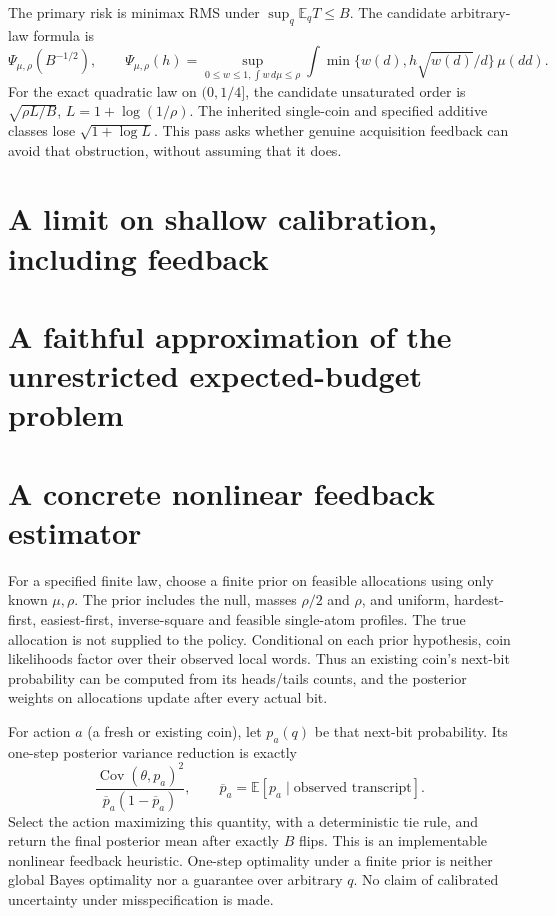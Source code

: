 \documentclass[11pt]{article}
\newcommand{\E}{\mathbb E}
\begin{document}
The primary risk is minimax RMS under $\sup_q\E_qT\le B$. The candidate
arbitrary-law formula is
\[
 \Psi_{\mu,\rho}(B^{-1/2}),\qquad
 \Psi_{\mu,\rho}(h)=\sup_{0\le w\le1,\int w\,d\mu\le\rho}
 \int\min\{w(d),h\sqrt{w(d)}/d\}\,\mu(dd).
\]
For the exact quadratic law on $(0,1/4]$, the candidate unsaturated order
is $\sqrt{\rho L/B}$, $L=1+\log(1/\rho)$. The inherited single-coin and
specified additive classes lose $\sqrt{1+\log L}$. This pass asks whether
genuine acquisition feedback can avoid that obstruction, without assuming
that it does.





\section{A limit on shallow calibration, including feedback}




\section{A faithful approximation of the unrestricted expected-budget problem}


\section{A concrete nonlinear feedback estimator}
For a specified finite law, choose a finite prior on feasible allocations
using only known $\mu,\rho$. The prior includes the null, masses $\rho/2$
and $\rho$, and uniform, hardest-first, easiest-first, inverse-square and
feasible single-atom profiles. The true allocation is not supplied to the
policy. Conditional on each prior hypothesis, coin likelihoods factor over
their observed local words. Thus an existing coin's next-bit probability
can be computed from its heads/tails counts, and the posterior weights
on allocations update after every actual bit.

For action $a$ (a fresh or existing coin), let $p_a(q)$ be that next-bit
probability. Its one-step posterior variance reduction is exactly
\[
 \frac{\operatorname{Cov}(\theta,p_a)^2}
      {\overline p_a(1-\overline p_a)},\qquad
 \overline p_a=\E[p_a\mid\text{observed transcript}].
\]
Select the action maximizing this quantity, with a deterministic tie rule,
and return the final posterior mean after exactly $B$ flips. This is an
implementable nonlinear feedback heuristic. One-step optimality under a
finite prior is neither global Bayes optimality nor a guarantee over
arbitrary $q$. No claim of calibrated uncertainty under misspecification
is made.
\end{document}
